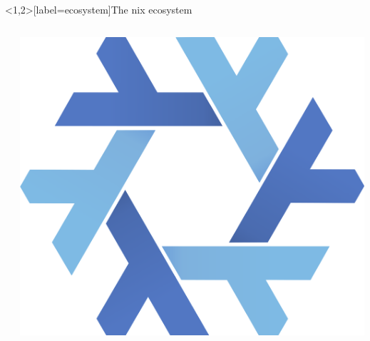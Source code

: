 \documentclass[aspectratio=169]{beamer}
\begin{document}
\begin{frame}<1,2>[label=ecosystem]{The nix ecosystem}
    \begin{columns}[t]
        \begin{column}{0.4\textwidth}
            \begin{overlayarea}{\textwidth}{.5\textheight}
                \begin{itemize}
                \end{itemize}
            \end{overlayarea}
        \end{column}
        \begin{column}{0.4\textwidth}
            \begin{overlayarea}{\textwidth}{.5\textheight}
                \includegraphics[width=\linewidth]{nixos-logo-only-hires.png}
            \end{overlayarea}
        \end{column}
    \end{columns}
\end{frame}
\end{document}

